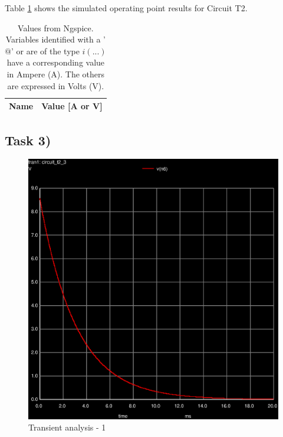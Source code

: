Table \ref{tab:op2} shows the simulated operating point results for Circuit T2.

\begin{table}[ht]
	\centering
	\begin{tabular}{|l|r|}
		\hline    
		{\bf Name} & {\bf Value [A or V]} \\ \hline
    		
	\end{tabular}
	
	\caption{Values from Ngspice. Variables identified with a '$@$' or are of the type
	$i(...)$ have a corresponding value in Ampere (A). The others are expressed in Volts (V).}
    
\label{tab:op2}
\end{table}


\subsection{Task 3)}
\label{subsec:task3}


\begin{figure}[ht]
	\centering
	\includegraphics[width=0.55\linewidth]{trans-1.eps}
	\caption{Transient analysis - 1}
\label{fig:trans-1}
\end{figure}


